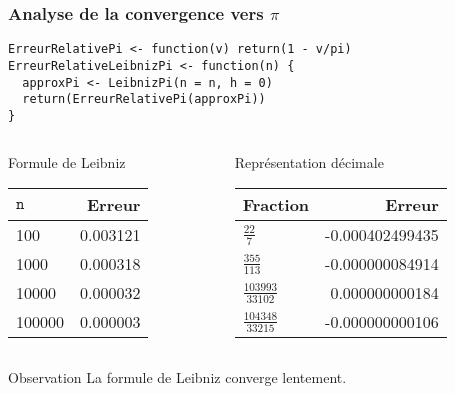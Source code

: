 \documentclass[10pt]{beamer}
\begin{document}
\begin{frame}[fragile]
  \frametitle{Analyse de la convergence vers $\pi$}
  \begin{lstlisting}[style=editor]
ErreurRelativePi <- function(v) return(1 - v/pi)
ErreurRelativeLeibnizPi <- function(n) {
  approxPi <- LeibnizPi(n = n, h = 0)
  return(ErreurRelativePi(approxPi))
}
\end{lstlisting}



\begin{columns}[t]
\begin{column}{0.48\textwidth}
  \begin{exampleblock}{Formule de Leibniz}
    \begin{tabular}{lr}
      \toprule
    $\mathtt{n}$ & Erreur   \\
    \midrule
    100          & 0.003121 \\
    1000         & 0.000318 \\
    10000        & 0.000032 \\
    100000       & 0.000003 \\
      \bottomrule
  \end{tabular}
    
  \end{exampleblock}

\end{column}
\begin{column}{0.48\textwidth}
  \begin{exampleblock}{Représentation décimale}
    \begin{tabular}{lr}
    \toprule
    Fraction               & Erreur          \\
    \midrule
    $\frac{22}{7}$         & -0.000402499435 \\
    $\frac{355}{113}$      & -0.000000084914 \\
    $\frac{103993}{33102}$ & 0.000000000184  \\
    $\frac{104348}{33215}$ & -0.000000000106 \\
    \bottomrule
  \end{tabular}
  \end{exampleblock}
\end{column}
\end{columns}



\begin{alertblock}{Observation}
  \alert{La formule de Leibniz converge lentement.}
\end{alertblock}

\end{frame}
\end{document}
